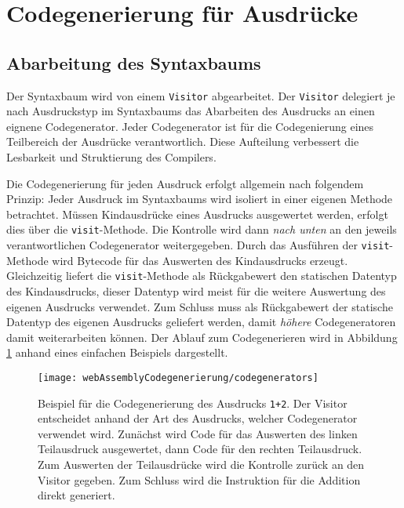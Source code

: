

\section{Codegenerierung für Ausdrücke}
\label{sec:Codegenerierung-für-Ausdrücke}

\subsection{Abarbeitung des Syntaxbaums}
Der Syntaxbaum wird von einem \lstinline{Visitor} abgearbeitet. Der \lstinline{Visitor} delegiert je nach Ausdruckstyp im Syntaxbaums das Abarbeiten des Ausdrucks an einen eignene Codegenerator. Jeder Codegenerator ist für die Codegenierung eines Teilbereich der Ausdrücke verantwortlich. Diese Aufteilung verbessert die Lesbarkeit und Struktierung des Compilers.

Die Codegenerierung für jeden Ausdruck erfolgt allgemein nach folgendem Prinzip: Jeder Ausdruck im Syntaxbaums wird isoliert in einer eigenen Methode betrachtet. Müssen Kindausdrücke eines Ausdrucks ausgewertet werden, erfolgt dies über die \lstinline{visit}-Methode. Die Kontrolle wird dann \emph{nach unten} an den jeweils verantwortlichen Codegenerator weitergegeben. Durch das Ausführen der \lstinline{visit}-Methode wird Bytecode für das Auswerten des Kindausdrucks erzeugt. Gleichzeitig liefert die \lstinline{visit}-Methode als Rückgabewert den statischen Datentyp des Kindausdrucks, dieser Datentyp wird meist für die weitere Auswertung des eigenen Ausdrucks verwendet. Zum Schluss muss als Rückgabewert der statische Datentyp des eigenen Ausdrucks geliefert werden, damit \emph{höhere} Codegeneratoren damit weiterarbeiten können. Der Ablauf zum Codegenerieren wird in Abbildung \ref{fig:codegenerators} anhand eines einfachen Beispiels dargestellt.

\begin{figure}[]
    \centering
    \texttt{[image: webAssemblyCodegenerierung/codegenerators]}
    \caption{Beispiel für die Codegenerierung des Ausdrucks \lstinline{1+2}. Der Visitor entscheidet anhand der Art des Ausdrucks, welcher Codegenerator verwendet wird. Zunächst wird Code für das Auswerten des linken Teilausdruck ausgewertet, dann Code für den rechten Teilausdruck. Zum Auswerten der Teilausdrücke wird die Kontrolle zurück an den Visitor gegeben. Zum Schluss wird die Instruktion für die Addition direkt generiert.}
    \label{fig:codegenerators}
\end{figure}

